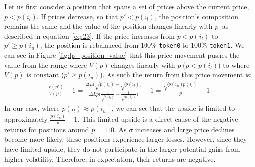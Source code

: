 \documentclass[11pt]{article}
\begin{document}
Let us first consider a position that spans a set of prices above the current price, $p < p(i_l)$. If prices decrease, so that $p' < p(i_l)$, the position's composition remains the same and the value of the position changes linearly with $p$, as described in equation~\eqref{eq:23}. If the price increases from $p < p(i_l)$ to $p' \ge p(i_u)$, the position is rebalanced from 100\% \texttt{token0} to 100\% \texttt{token1}. We can see in Figure \ref{fig:lp_position_value} that this price movement pushes the value from the range where $V(p)$ changes linearly with $p$ ($p < p(i_l)$) to where $V(p)$ is constant ($p' \ge p(i_u)$). As such the return from this price movement is:
\begin{gather}
    \frac{V(p')}{V(p)} - 1 = \frac{\Delta L \big( \sqrt{p(i_u)} - \sqrt{p(i_l)} \big)}{\Delta L p \bigg( \frac{1}{\sqrt{p(i_l)}} - \frac{1}{\sqrt{p(i_u)}} \bigg)} - 1 = \frac{\sqrt{p(i_u) p(i_l)}}{p} - 1
\end{gather}
In our case, where $p(i_l) \approx p(i_u)$, we can see that the upside is limited to approximately $\frac{p(i_u)}{p} - 1$. This limited upside is a direct cause of the negative returns for positions around $p=110$. As $\sigma$ increases and large price declines become more likely, these positions experience larger losses. However, since they have limited upside, they do not participate in the larger potential gains from higher volatility. Therefore, in expectation, their returns are negative.
\end{document}
